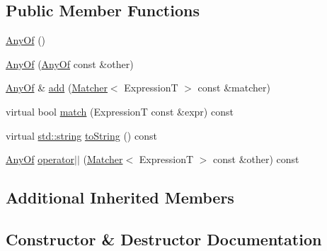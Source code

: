 \subsection*{Public Member Functions}
\begin{DoxyCompactItemize}
\item 
\hyperlink{class_catch_1_1_matchers_1_1_impl_1_1_generic_1_1_any_of_a131d84740c6b250ff7ef2213ae0de2aa}{Any\+Of} ()
\item 
\hyperlink{class_catch_1_1_matchers_1_1_impl_1_1_generic_1_1_any_of_a74fbc05b32d334fcbfd0fae0163a404e}{Any\+Of} (\hyperlink{class_catch_1_1_matchers_1_1_impl_1_1_generic_1_1_any_of}{Any\+Of} const \&other)
\item 
\hyperlink{class_catch_1_1_matchers_1_1_impl_1_1_generic_1_1_any_of}{Any\+Of} \& \hyperlink{class_catch_1_1_matchers_1_1_impl_1_1_generic_1_1_any_of_a3bce94b627551e5f96c5f9c6060413f0}{add} (\hyperlink{struct_catch_1_1_matchers_1_1_impl_1_1_matcher}{Matcher}$<$ ExpressionT $>$ const \&matcher)
\item 
virtual bool \hyperlink{class_catch_1_1_matchers_1_1_impl_1_1_generic_1_1_any_of_a2f97a08338e12deba541043a57d73db9}{match} (ExpressionT const \&expr) const 
\item 
virtual \hyperlink{_s_d_l__opengl__glext_8h_ae84541b4f3d8e1ea24ec0f466a8c568b}{std\+::string} \hyperlink{class_catch_1_1_matchers_1_1_impl_1_1_generic_1_1_any_of_a7ecc6ec08b2018a643923a9d450aa328}{to\+String} () const 
\item 
\hyperlink{class_catch_1_1_matchers_1_1_impl_1_1_generic_1_1_any_of}{Any\+Of} \hyperlink{class_catch_1_1_matchers_1_1_impl_1_1_generic_1_1_any_of_a07f4ea2ae366a6521a5d7bff4522e8bf}{operator$\vert$$\vert$} (\hyperlink{struct_catch_1_1_matchers_1_1_impl_1_1_matcher}{Matcher}$<$ ExpressionT $>$ const \&other) const 
\end{DoxyCompactItemize}
\subsection*{Additional Inherited Members}


\subsection{Constructor \& Destructor Documentation}
